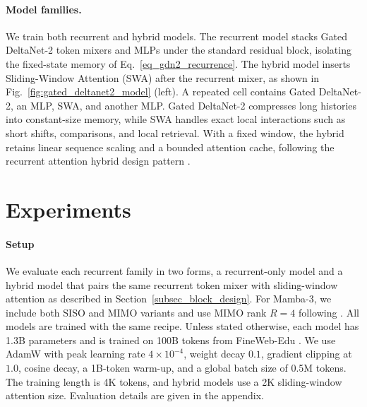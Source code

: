 \documentclass[10pt, logo, onecolumn, copyright]{nv}
\begin{document}
\paragraph{Model families.}
We train both recurrent and hybrid models. The recurrent model stacks Gated DeltaNet-2 token mixers and MLPs under the standard residual block, isolating the fixed-state memory of Eq.~\ref{eq_gdn2_recurrence}. The hybrid model inserts Sliding-Window Attention (SWA) after the recurrent mixer, as shown in Fig.~\ref{fig:gated_deltanet2_model} (left). A repeated cell contains Gated DeltaNet-2, an MLP, SWA, and another MLP. Gated DeltaNet-2 compresses long histories into constant-size memory, while SWA handles exact local interactions such as short shifts, comparisons, and local retrieval. With a fixed window, the hybrid retains linear sequence scaling and a bounded attention cache, following the recurrent attention hybrid design pattern \citep{de_griffin_2024,ren2024samba}.

\section{Experiments}
\label{sec_exp}
\paragraph{Setup}
We evaluate each recurrent family in two forms, a recurrent-only model and a hybrid model that pairs the same recurrent token mixer with sliding-window attention as described in Section~\ref{subsec_block_design}. For Mamba-3, we include both SISO and MIMO variants and use MIMO rank $R=4$ following \citep{lahoti2026mamba3}. All models are trained with the same recipe. Unless stated otherwise, each model has 1.3B parameters and is trained on 100B tokens from FineWeb-Edu \citep{penedo2024fineweb}. We use AdamW with peak learning rate $4\times10^{-4}$, weight decay $0.1$, gradient clipping at $1.0$, cosine decay, a 1B-token warm-up, and a global batch size of 0.5M tokens. The training length is 4K tokens, and hybrid models use a 2K sliding-window attention size. Evaluation details are given in the appendix.
\end{document}
